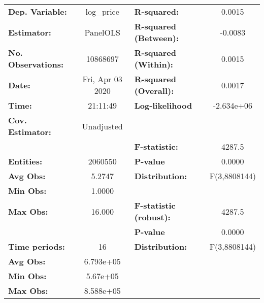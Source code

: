 \documentclass{report}
\begin{document}
\begin{center}
\begin{tabular}{lclc}
\toprule
\textbf{Dep. Variable:}        &     log\_price     & \textbf{  R-squared:         }   &      0.0015      \\
\textbf{Estimator:}            &      PanelOLS      & \textbf{  R-squared (Between):}  &     -0.0083      \\
\textbf{No. Observations:}     &      10868697      & \textbf{  R-squared (Within):}   &      0.0015      \\
\textbf{Date:}                 &  Fri, Apr 03 2020  & \textbf{  R-squared (Overall):}  &      0.0017      \\
\textbf{Time:}                 &      21:11:49      & \textbf{  Log-likelihood     }   &    -2.634e+06    \\
\textbf{Cov. Estimator:}       &     Unadjusted     & \textbf{                     }   &                  \\
\textbf{}                      &                    & \textbf{  F-statistic:       }   &      4287.5      \\
\textbf{Entities:}             &      2060550       & \textbf{  P-value            }   &      0.0000      \\
\textbf{Avg Obs:}              &       5.2747       & \textbf{  Distribution:      }   &   F(3,8808144)   \\
\textbf{Min Obs:}              &       1.0000       & \textbf{                     }   &                  \\
\textbf{Max Obs:}              &       16.000       & \textbf{  F-statistic (robust):} &      4287.5      \\
\textbf{}                      &                    & \textbf{  P-value            }   &      0.0000      \\
\textbf{Time periods:}         &         16         & \textbf{  Distribution:      }   &   F(3,8808144)   \\
\textbf{Avg Obs:}              &     6.793e+05      & \textbf{                     }   &                  \\
\textbf{Min Obs:}              &      5.67e+05      & \textbf{                     }   &                  \\
\textbf{Max Obs:}              &     8.588e+05      & \textbf{                     }   &                  \\
\bottomrule
\end{tabular}
\begin{tabular}{lcccccc}

\end{tabular}
\end{center}
\end{document}
